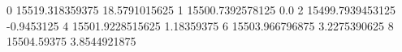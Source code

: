 0 15519.318359375 18.5791015625
1 15500.7392578125 0.0
2 15499.7939453125 -0.9453125
4 15501.9228515625 1.18359375
6 15503.966796875 3.2275390625
8 15504.59375 3.8544921875
